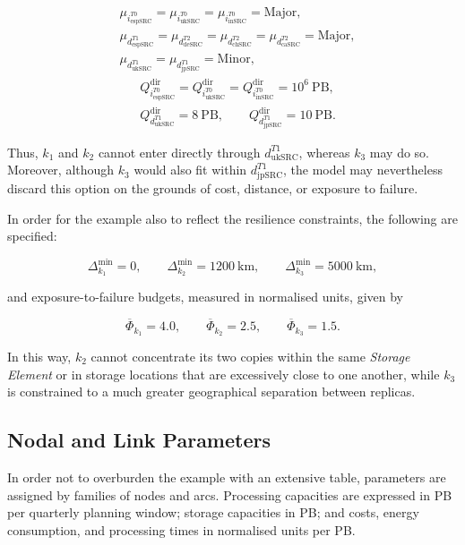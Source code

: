 \documentclass[a4paper,fleqn]{cas-dc}
\begin{document}
\begin{align*}
&\mu_{i_{\mathrm{espSRC}}^{T0}}=\mu_{i_{\mathrm{ukSRC}}^{T0}}=\mu_{i_{\mathrm{inSRC}}^{T0}}=\mathrm{Major},\\
&\mu_{d_{\mathrm{espSRC}}^{T1}}=\mu_{d_{\mathrm{deSRC}}^{T2}}=
\mu_{d_{\mathrm{chSRC}}^{T2}}=\mu_{d_{\mathrm{caSRC}}^{T2}}=\mathrm{Major},\\
&\mu_{d_{\mathrm{ukSRC}}^{T1}}=\mu_{d_{\mathrm{jpSRC}}^{T1}}=\mathrm{Minor},
\end{align*}
\begin{align*}
&Q_{i_{\mathrm{espSRC}}^{T0}}^{\mathrm{dir}}=Q_{i_{\mathrm{ukSRC}}^{T0}}^{\mathrm{dir}}=
Q_{i_{\mathrm{inSRC}}^{T0}}^{\mathrm{dir}}=10^6\ \text{PB},\\
&Q_{d_{\mathrm{ukSRC}}^{T1}}^{\mathrm{dir}}=8\ \text{PB},
\qquad
Q_{d_{\mathrm{jpSRC}}^{T1}}^{\mathrm{dir}}=10\ \text{PB}.
\end{align*}

Thus, \(k_1\) and \(k_2\) cannot enter directly through \(d_{\mathrm{ukSRC}}^{T1}\), whereas \(k_3\) may do so. Moreover, although \(k_3\) would also fit within \(d_{\mathrm{jpSRC}}^{T1}\), the model may nevertheless discard this option on the grounds of cost, distance, or exposure to failure.

In order for the example also to reflect the resilience constraints, the following are specified:

\[
\Delta_{k_1}^{\min}=0,\qquad
\Delta_{k_2}^{\min}=1200\ \text{km},\qquad
\Delta_{k_3}^{\min}=5000\ \text{km},
\]

and exposure-to-failure budgets, measured in normalised units, given by

\[
\overline\Phi_{k_1}=4.0,
\qquad
\overline\Phi_{k_2}=2.5,
\qquad
\overline\Phi_{k_3}=1.5.
\]


In this way, \(k_2\) cannot concentrate its two copies within the same \emph{Storage Element} or in storage locations that are excessively close to one another, while \(k_3\) is constrained to a much greater geographical separation between replicas.


\subsection{Nodal and Link Parameters}

In order not to overburden the example with an extensive table, parameters are assigned by families of nodes and arcs. Processing capacities are expressed in PB per quarterly planning window; storage capacities in PB; and costs, energy consumption, and processing times in normalised units per PB.
\end{document}
